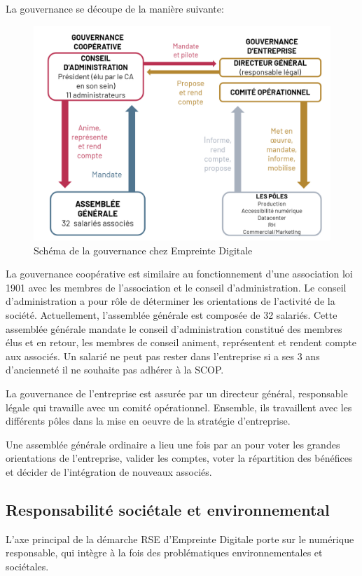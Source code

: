 \documentclass[12pt, a4paper, twoside]{article}
\begin{document}
\newpage
La gouvernance se découpe de la manière suivante:
\begin{figure}[!ht]
    \centering
    \includegraphics[width=\textwidth]{src/scheme_scop_ed.png}
    \caption{Schéma de la gouvernance chez Empreinte Digitale}
    \label{fig:gouvernance_ed}
\end{figure}

La gouvernance coopérative est similaire au fonctionnement d'une association loi 1901 avec les membres de l'association et le conseil d'administration. 
Le conseil d'administration a pour rôle de déterminer les orientations de l'activité de la société. 
Actuellement, l'assemblée générale est composée de 32 salariés. 
Cette assemblée générale mandate le conseil d'administration constitué des membres élus et en retour, les membres de conseil animent, représentent et rendent compte aux associés.
Un salarié ne peut pas rester dans l'entreprise si a ses 3 ans d'ancienneté il ne souhaite pas adhérer à la \gls{SCOP}. 

La gouvernance de l'entreprise est assurée par un directeur général, responsable légale qui travaille avec un comité opérationnel. 
Ensemble, ils travaillent avec les différents pôles dans la mise en oeuvre de la stratégie d'entreprise.

Une assemblée générale ordinaire a lieu une fois par an pour voter les grandes orientations de l'entreprise, valider les comptes, voter la répartition des bénéfices et décider de l'intégration de nouveaux associés.

\subsection{Responsabilité sociétale et environnemental}
L'axe principal de la démarche \gls{RSE} d'Empreinte Digitale porte sur le numérique responsable, qui intègre à la fois des problématiques environnementales et sociétales.
\end{document}
